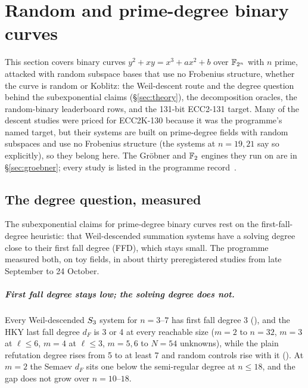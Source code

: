 \chapter{Random and prime-degree binary curves}\label{sec:binary}

This section covers binary curves $y^2+xy=x^3+ax^2+b$ over $\mathbb{F}_{2^n}$
with $n$ prime, attacked with random subspace bases that use no Frobenius
structure, whether the curve is random or Koblitz: the Weil-descent route and the
degree question behind the subexponential claims
(\S\ref{sec:theory}), the decomposition oracles, the random-binary
leaderboard rows, and the 131-bit ECC2-131 target. Many of the descent
studies were priced for ECC2K-130 because it was the programme's named
target, but their systems are built on prime-degree fields with random
subspaces and use no Frobenius structure (the systems at $n=19,21$ say so
explicitly), so they belong here. The Gröbner and $\mathbb{F}_2$ engines they run
on are in \S\ref{sec:groebner}; every study is listed in
the programme record~\cite{icprogram2026}.

\section{The degree question, measured}\label{sec:binary-descent}

The subexponential claims for prime-degree binary curves rest on the
first-fall-degree heuristic: that Weil-descended summation systems have a
solving degree close to their first fall degree (FFD), which stays small.
The programme measured both, on toy fields, in about thirty preregistered
studies from late September to 24 October.

\paragraph{First fall degree stays low; the solving degree does not.} Every
Weil-descended $S_{3}$ system for $n=3$--$7$ has first fall degree 3
(), and the
HKY last fall degree $d_F$ is 3 or 4 at every reachable size ($m=2$ to
$n=32$, $m=3$ at $\ell\le6$, $m=4$ at $\ell\le3$, $m=5,6$ to $N=54$
unknowns), while the plain refutation degree rises from 5 to at least 7
and random controls rise with it ().
At $m=2$ the Semaev $d_F$ sits one below the semi-regular degree at
$n\le18$, and the gap does not grow over $n=10$--$18$.

